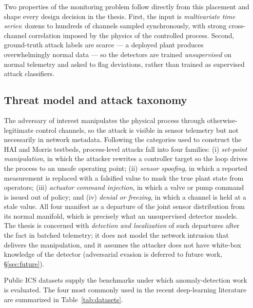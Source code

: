 Two properties of the monitoring problem follow directly from this placement and shape every design decision in the thesis.  First, the input is \emph{multivariate time series}: dozens to hundreds of channels sampled synchronously, with strong cross-channel correlation imposed by the physics of the controlled process.  Second, ground-truth attack labels are scarce --- a deployed plant produces overwhelmingly normal data --- so the detectors are trained \emph{unsupervised} on normal telemetry and asked to flag deviations, rather than trained as supervised attack classifiers.

\subsection{Threat model and attack taxonomy}

The adversary of interest manipulates the physical process through otherwise-legitimate control channels, so the attack is visible in sensor telemetry but not necessarily in network metadata.  Following the categories used to construct the HAI and Morris testbeds, process-level attacks fall into four families: (i) \emph{set-point manipulation}, in which the attacker rewrites a controller target so the loop drives the process to an unsafe operating point; (ii) \emph{sensor spoofing}, in which a reported measurement is replaced with a falsified value to mask the true plant state from operators; (iii) \emph{actuator command injection}, in which a valve or pump command is issued out of policy; and (iv) \emph{denial or freezing}, in which a channel is held at a stale value.  All four manifest as a departure of the joint sensor distribution from its normal manifold, which is precisely what an unsupervised detector models.  The thesis is concerned with \emph{detection and localization} of such departures after the fact in batched telemetry; it does not model the network intrusion that delivers the manipulation, and it assumes the attacker does not have white-box knowledge of the detector (adversarial evasion is deferred to future work, \S\ref{sec:future}).

Public ICS datasets supply the benchmarks under which anomaly-detection work is evaluated.  The four most commonly used in the recent deep-learning literature are summarized in Table~\ref{tab:datasets}.

